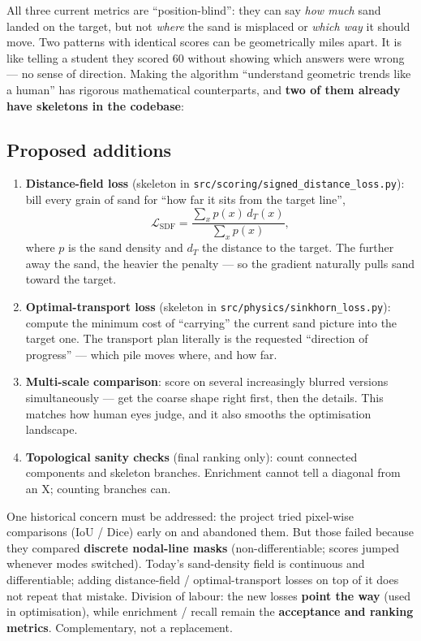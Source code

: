 \documentclass[11pt,a4paper]{article}
\newcommand{\code}[1]{\texttt{#1}}
\begin{document}
All three current metrics are ``position-blind'': they can say \emph{how much} sand landed on the target, but not \emph{where} the sand is misplaced or \emph{which way} it should move. Two patterns with identical scores can be geometrically miles apart. It is like telling a student they scored 60 without showing which answers were wrong --- no sense of direction. Making the algorithm ``understand geometric trends like a human'' has rigorous mathematical counterparts, and \textbf{two of them already have skeletons in the codebase}:

\subsection{Proposed additions}

\begin{enumerate}[leftmargin=2em]
\item \textbf{Distance-field loss} (skeleton in \code{src/scoring/signed\_distance\_loss.py}): bill every grain of sand for ``how far it sits from the target line'',
\begin{equation}
\mathcal{L}_{\mathrm{SDF}} = \frac{\sum_{x} p(x)\, d_T(x)}{\sum_x p(x)},
\end{equation}
where $p$ is the sand density and $d_T$ the distance to the target. The further away the sand, the heavier the penalty --- so the gradient naturally pulls sand toward the target.
\item \textbf{Optimal-transport loss} (skeleton in \code{src/physics/sinkhorn\_loss.py}): compute the minimum cost of ``carrying'' the current sand picture into the target one. The transport plan literally is the requested ``direction of progress'' --- which pile moves where, and how far.
\item \textbf{Multi-scale comparison}: score on several increasingly blurred versions simultaneously --- get the coarse shape right first, then the details. This matches how human eyes judge, and it also smooths the optimisation landscape.
\item \textbf{Topological sanity checks} (final ranking only): count connected components and skeleton branches. Enrichment cannot tell a diagonal from an X; counting branches can.
\end{enumerate}

One historical concern must be addressed: the project tried pixel-wise comparisons (IoU / Dice) early on and abandoned them. But those failed because they compared \textbf{discrete nodal-line masks} (non-differentiable; scores jumped whenever modes switched). Today's sand-density field is continuous and differentiable; adding distance-field / optimal-transport losses on top of it does not repeat that mistake. Division of labour: the new losses \textbf{point the way} (used in optimisation), while enrichment / recall remain the \textbf{acceptance and ranking metrics}. Complementary, not a replacement.
\end{document}
